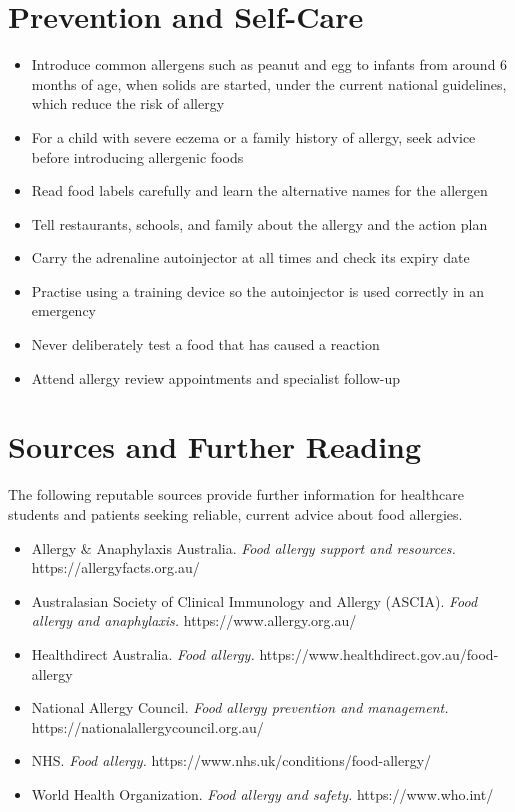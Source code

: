 \section*{Prevention and Self-Care}
\begin{itemize}
    \item Introduce common allergens such as peanut and egg to infants from around 6 months of age, when solids are started, under the current national guidelines, which reduce the risk of allergy
    \item For a child with severe eczema or a family history of allergy, seek advice before introducing allergenic foods
    \item Read food labels carefully and learn the alternative names for the allergen
    \item Tell restaurants, schools, and family about the allergy and the action plan
    \item Carry the adrenaline autoinjector at all times and check its expiry date
    \item Practise using a training device so the autoinjector is used correctly in an emergency
    \item Never deliberately test a food that has caused a reaction
    \item Attend allergy review appointments and specialist follow-up
\end{itemize}

\section*{Sources and Further Reading}
The following reputable sources provide further information for healthcare students and patients seeking reliable, current advice about food allergies.
\begin{itemize}
    \item Allergy \& Anaphylaxis Australia. \textit{Food allergy support and resources.} https://allergyfacts.org.au/
    \item Australasian Society of Clinical Immunology and Allergy (ASCIA). \textit{Food allergy and anaphylaxis.} https://www.allergy.org.au/
    \item Healthdirect Australia. \textit{Food allergy.} https://www.healthdirect.gov.au/food-allergy
    \item National Allergy Council. \textit{Food allergy prevention and management.} https://nationalallergycouncil.org.au/
    \item NHS. \textit{Food allergy.} https://www.nhs.uk/conditions/food-allergy/
    \item World Health Organization. \textit{Food allergy and safety.} https://www.who.int/
\end{itemize}
